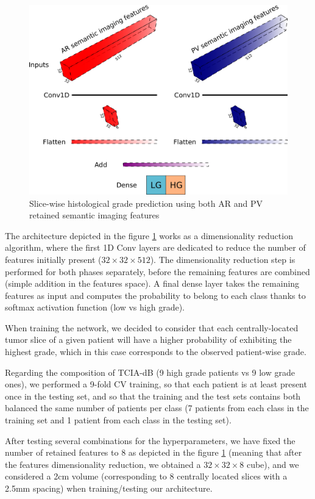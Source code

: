 \documentclass[]{article}
\begin{document}
\begin{figure}[th!]
\centering
\includegraphics[width=0.7\linewidth]{images/gradpredictionArchitecture}
\caption{Slice-wise histological grade prediction using both AR and PV retained semantic imaging features}
\label{fig:gradpredictionArchitecture}
\end{figure}



The architecture depicted in the figure \ref{fig:gradpredictionArchitecture} works as a dimensionality
reduction algorithm, where the first 1D Conv layers are dedicated to
reduce the number of features initially present ($ 32\times32\times512 $). The
dimensionality reduction step is performed for both phases separately,
before the remaining features are combined (simple addition in the
features space).
A final dense layer takes the remaining features as input and computes
the probability to belong to each class thanks to softmax activation
function (low vs high grade).

When training the network, we decided to consider that each
centrally-located tumor slice of a given patient will have a higher
probability of exhibiting the highest grade, which in this case
corresponds to the observed patient-wise grade.

Regarding the composition of TCIA-dB (9 high grade patients vs 9 low
grade ones), we performed a 9-fold CV training, so that each patient is
at least present once in the testing set, and so that the training and
the test sets contains both balanced the same number of patients per
class (7 patients from each class in the training set and 1 patient from
each class in the testing set).

After testing several combinations for the hyperparameters, we have
fixed the number of retained features to 8 as depicted in the
figure \ref{fig:gradpredictionArchitecture} (meaning that after the features dimensionality reduction,
we obtained a $ 32\times32\times8 $ cube), and we considered a 2cm volume
(corresponding to 8 centrally located slices with a 2.5mm spacing) when
training/testing our architecture.
\end{document}
